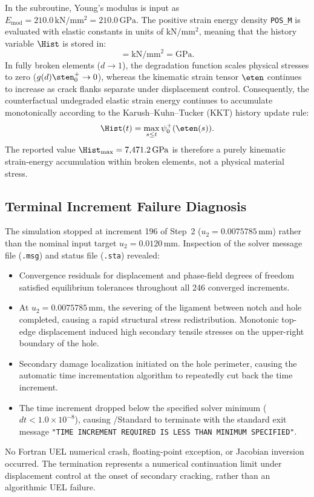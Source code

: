In the subroutine, Young's modulus is input as $E_{\mathrm{mod}} = 210.0\,\mathrm{kN/mm^2} = 210.0\,\mathrm{GPa}$. The positive strain energy density \texttt{POS\_M} is evaluated with elastic constants in units of $\mathrm{kN/mm^2}$, meaning that the history variable $\Hist$ is stored in:
\begin{equation}
  [\Hist] = \mathrm{kN/mm^2} = \mathrm{GPa}.
\end{equation}
In fully broken elements ($d \to 1$), the degradation function scales physical stresses to zero ($g(d)\sten_0^+ \to 0$), whereas the kinematic strain tensor $\eten$ continues to increase as crack flanks separate under displacement control. Consequently, the counterfactual undegraded elastic strain energy continues to accumulate monotonically according to the Karush--Kuhn--Tucker (KKT) history update rule:
\begin{equation}
  \Hist(t) = \max_{s \le t} \psi_0^+(\eten(s)).
  \label{eq:kkt_history}
\end{equation}
The reported value $\Hist_{\max} = 7{,}471.2\,\mathrm{GPa}$ is therefore a purely kinematic strain-energy accumulation within broken elements, not a physical material stress.

\subsection{Terminal Increment Failure Diagnosis}
\label{subsec:hole_terminal_diagnosis}

The simulation stopped at increment 196 of Step~2 ($u_2 = 0.0075785\,\mathrm{mm}$) rather than the nominal input target $u_2 = 0.0120\,\mathrm{mm}$. Inspection of the solver message file (\texttt{.msg}) and status file (\texttt{.sta}) revealed:
\begin{itemize}
  \item Convergence residuals for displacement and phase-field degrees of freedom satisfied equilibrium tolerances throughout all 246 converged increments.
  \item At $u_2 = 0.0075785\,\mathrm{mm}$, the severing of the ligament between notch and hole completed, causing a rapid structural stress redistribution. Monotonic top-edge displacement induced high secondary tensile stresses on the upper-right boundary of the hole.
  \item Secondary damage localization initiated on the hole perimeter, causing the automatic time incrementation algorithm to repeatedly cut back the time increment.
  \item The time increment dropped below the specified solver minimum ($dt < 1.0 \times 10^{-8}$), causing \Abaqus/Standard to terminate with the standard exit message \texttt{"TIME INCREMENT REQUIRED IS LESS THAN MINIMUM SPECIFIED"}.
\end{itemize}
No Fortran UEL numerical crash, floating-point exception, or Jacobian inversion occurred. The termination represents a numerical continuation limit under displacement control at the onset of secondary cracking, rather than an algorithmic UEL failure.

